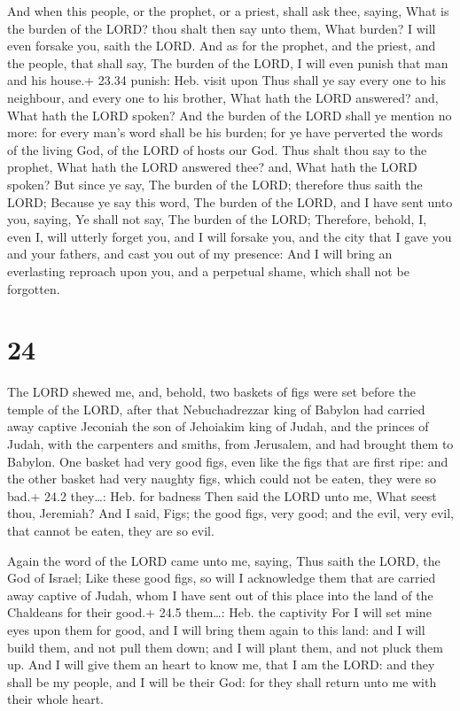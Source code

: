  And when this people, or the prophet, or a priest, shall
ask thee, saying, What is the burden of the LORD? thou shalt then say
unto them, What burden? I will even forsake you, saith the LORD.
 And as for the prophet, and the priest, and the people,
that shall say, The burden of the LORD, I will even punish that man and
his house.+ 23.34 punish: Heb. visit upon  Thus shall ye
say every one to his neighbour, and every one to his brother, What hath
the LORD answered? and, What hath the LORD spoken?  And the
burden of the LORD shall ye mention no more: for every man's word shall
be his burden; for ye have perverted the words of the living God, of the
LORD of hosts our God.  Thus shalt thou say to the prophet,
What hath the LORD answered thee? and, What hath the LORD spoken?
 But since ye say, The burden of the LORD; therefore thus
saith the LORD; Because ye say this word, The burden of the LORD, and I
have sent unto you, saying, Ye shall not say, The burden of the LORD;
 Therefore, behold, I, even I, will utterly forget you, and
I will forsake you, and the city that I gave you and your fathers, and
cast you out of my presence:  And I will bring an
everlasting reproach upon you, and a perpetual shame, which shall not be
forgotten.

\hypertarget{section-23}{%
\section{24}\label{section-23}}

 The LORD shewed me, and, behold, two baskets of figs were
set before the temple of the LORD, after that Nebuchadrezzar king of
Babylon had carried away captive Jeconiah the son of Jehoiakim king of
Judah, and the princes of Judah, with the carpenters and smiths, from
Jerusalem, and had brought them to Babylon.  One basket had
very good figs, even like the figs that are first ripe: and the other
basket had very naughty figs, which could not be eaten, they were so
bad.+ 24.2 they\ldots: Heb. for badness  Then said the LORD
unto me, What seest thou, Jeremiah? And I said, Figs; the good figs,
very good; and the evil, very evil, that cannot be eaten, they are so
evil.

 Again the word of the LORD came unto me, saying,
 Thus saith the LORD, the God of Israel; Like these good
figs, so will I acknowledge them that are carried away captive of Judah,
whom I have sent out of this place into the land of the Chaldeans for
their good.+ 24.5 them\ldots: Heb. the captivity  For I will
set mine eyes upon them for good, and I will bring them again to this
land: and I will build them, and not pull them down; and I will plant
them, and not pluck them up.  And I will give them an heart
to know me, that I am the LORD: and they shall be my people, and I will
be their God: for they shall return unto me with their whole heart.

